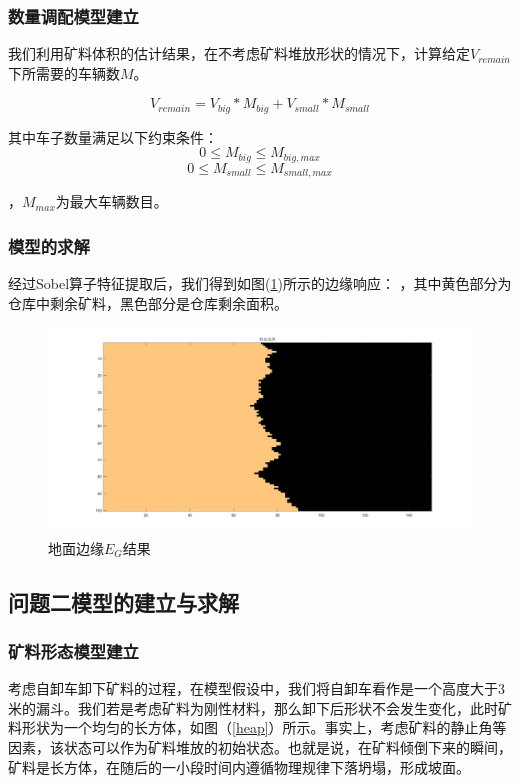 \documentclass{my_paper}
\begin{document}
        \subsubsection{数量调配模型建立}
    
        我们利用矿料体积的估计结果，在不考虑矿料堆放形状的情况下，计算给定$V_{remain}$下所需要的车辆数$M$。

        \begin{equation}
            V_{remain}=V_{big}*M_{big}+V_{small}*M_{small}
        \end{equation}

        其中车子数量满足以下约束条件：
        \begin{equation*}
            0\leq M_{big} \leq M_{big,max}
        \end{equation*}
        \begin{equation*}
            0\leq M_{small} \leq M_{small,max}
        \end{equation*}

        ，$M_{max}$为最大车辆数目。

\subsubsection{模型的求解}
经过Sobel算子特征提取后，我们得到如图(\ref{sobel_r})所示的边缘响应：
，其中黄色部分为仓库中剩余矿料，黑色部分是仓库剩余面积。

\begin {figure}[h]
\centering %
\includegraphics[width=\textwidth]{untitled.jpg}
\caption{地面边缘$E_G$结果} %
\label{sobel_r}
\end {figure}

\subsection{问题二模型的建立与求解}
\subsubsection{矿料形态模型建立}
考虑自卸车卸下矿料的过程，在模型假设中，我们将自卸车看作是一个高度大于3米的漏斗。我们若是考虑矿料为刚性材料，那么卸下后形状不会发生变化，此时矿料形状为一个均匀的长方体，如图（\ref{heap}）所示。事实上，考虑矿料的静止角等因素，该状态可以作为矿料堆放的初始状态。也就是说，在矿料倾倒下来的瞬间，矿料是长方体，在随后的一小段时间内遵循物理规律下落坍塌，形成坡面。
\end{document}
